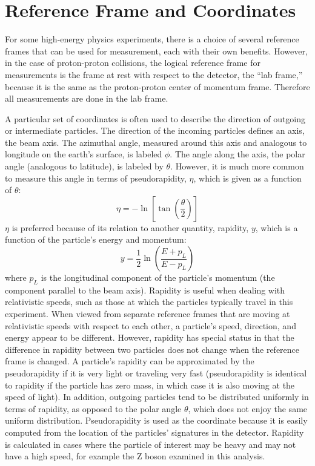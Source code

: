 \section{Reference Frame and Coordinates}


For some high-energy physics experiments, 
there is a choice of several reference 
frames that can be used for measurement, 
each with their own benefits.  
However, in the case of proton-proton collisions, 
the logical reference frame for measurements is 
the frame at rest with respect to the detector, 
the ``lab frame,'' 
because it is the same as the 
proton-proton center of momentum frame.  
Therefore all measurements are done 
in the lab frame.  



A particular set of coordinates is often used to describe 
the direction of outgoing or intermediate particles.  
The direction of the incoming particles defines an axis, 
the beam axis.  
The azimuthal angle, measured around this axis 
and analogous to longitude on the earth's surface, 
is labeled $\phi$.  
The angle along the axis, the polar angle 
(analogous to latitude), 
is labeled by $\theta$.  
However, it is much more common to measure this 
angle in terms of pseudorapidity, $\eta$, 
which is given as a function of $\theta$:
\[
\eta = -\ln \left[ \tan \left( \frac{\theta}{2}\right) \right]
\]
$\eta$ is preferred because of its relation to another quantity, 
rapidity, $y$, which is a function of the particle's 
energy and momentum:
\[
y = \frac{1}{2} \ln \left( \frac{E+p_L}{E-p_L} \right)
\]
where $p_L$ is the longitudinal component of the 
particle's momentum (the component parallel to the beam axis).  
Rapidity is useful when dealing with relativistic speeds, 
such as those at which the particles typically travel 
in this experiment.  %
When viewed from separate reference frames that are moving 
at relativistic speeds with respect to each other, 
a particle's speed, direction, and energy appear to be different.  
However, rapidity has special status in that the 
difference in rapidity 
between two particles does not change 
when the reference frame is changed.  
A particle's rapidity can be approximated by the 
pseudorapidity if it is very light or 
traveling very fast 
(pseudorapidity is identical to rapidity 
if the particle has zero mass, 
in which case it is also 
moving at the speed of light).  
In addition, outgoing particles tend to be 
distributed uniformly in terms of rapidity, 
as opposed to the polar angle $\theta$, 
which does not enjoy the same uniform distribution. 
Pseudorapidity is used as the coordinate %
because it is easily computed from the %
location of the particles' signatures in the detector.  %
Rapidity is calculated in cases 
where the particle of interest may be heavy 
and may not have a high speed, 
for example the Z boson examined in this analysis.  

